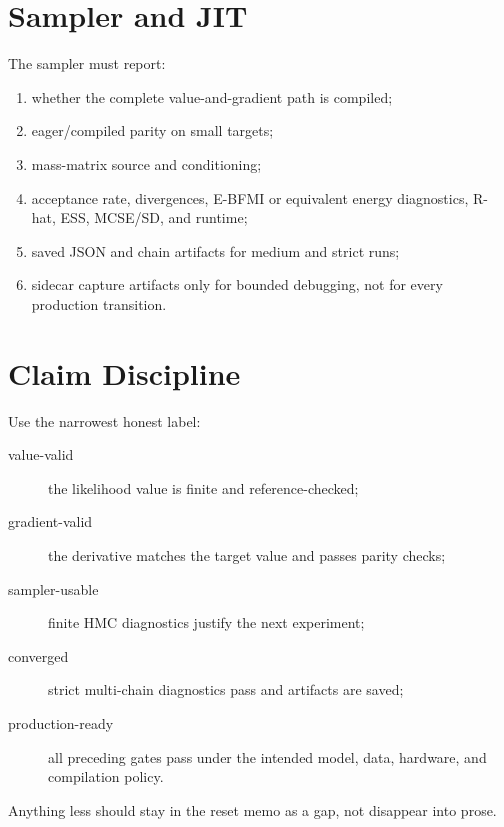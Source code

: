 \section{Sampler and JIT}
\label{sec:bf-production-sampler-jit}

The sampler must report:
\begin{enumerate}[label=(\roman*)]
  \item whether the complete value-and-gradient path is compiled;
  \item eager/compiled parity on small targets;
  \item mass-matrix source and conditioning;
  \item acceptance rate, divergences, E-BFMI or equivalent energy diagnostics,
    R-hat, ESS, MCSE/SD, and runtime;
  \item saved JSON and chain artifacts for medium and strict runs;
  \item sidecar capture artifacts only for bounded debugging, not for every
    production transition.
\end{enumerate}

\section{Claim Discipline}
\label{sec:bf-production-claim-discipline}

Use the narrowest honest label:
\begin{description}
  \item[value-valid] the likelihood value is finite and reference-checked;
  \item[gradient-valid] the derivative matches the target value and passes
    parity checks;
  \item[sampler-usable] finite HMC diagnostics justify the next experiment;
  \item[converged] strict multi-chain diagnostics pass and artifacts are saved;
  \item[production-ready] all preceding gates pass under the intended model,
    data, hardware, and compilation policy.
\end{description}
Anything less should stay in the reset memo as a gap, not disappear into prose.
